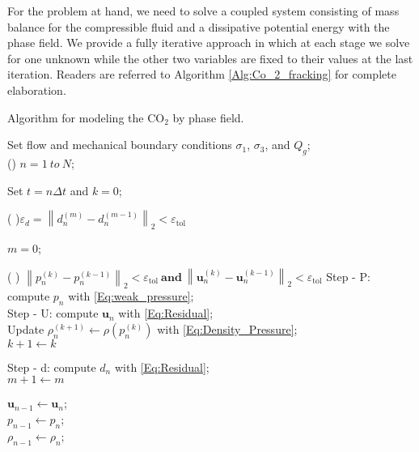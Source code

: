 For the problem at hand, we need to solve a coupled system consisting of mass balance for the compressible fluid and a dissipative potential energy with the phase field. We provide a fully iterative approach in which at each stage we solve for one unknown while the other two variables are fixed to their values at the last iteration. Readers are referred to Algorithm \ref{Alg:Co_2_fracking} for complete elaboration. 

\LinesNumbered
\begin{algorithm}[htbp]
	\caption{Algorithm for modeling the CO$_2$ by phase field.} \label{Alg:Co_2_fracking}
	
	
	Set flow and mechanical boundary conditions $\sigma_1$, $\sigma_3$, and $Q_g$;\\
	
	\For()
	{ {$n= 1 ~ to~ N$};  }{Set  $t=n\Delta t$ and $k=0$; 
		
		{\Repeat( ){$\varepsilon_d=\left\| d_n^{\left( m\right) }-d_{n}^{\left( m-1\right) } \right\|_{2}  <\varepsilon_{\text{tol}}$ }
			{ 
				$m=0$; 
				
				
				
				
				{\Repeat( ){   $\left\| p_n^{\left( k\right) }-p_{n}^{\left( k-1\right) } \right\|_{2}  <\varepsilon_{\text{tol}} ~\textbf{and}~ \left\| \bm{u}_n^{\left( k\right) }-\bm{u}_{n}^{\left( k-1\right) } \right\|_{2}  <\varepsilon_{\text{tol}}$  }
					{
						Step - P: compute $p_n$ with \eqref{Eq:weak_pressure};\\
						Step - U: compute $\bm{u}_{n}$ with \eqref{Eq:Residual};\label{line:compute_u}\\
						
						
						
						Update $ \rho_n^{\left( k+1\right) } \leftarrow \rho(p_n^{\left( k\right) })$ with \eqref{Eq:Density_Pressure};\\
						
						$k+1 \leftarrow k$
					}
				}
				
				
				Step - d: compute $d_n$ with \eqref{Eq:Residual}; \\
				$m+1 \leftarrow m$
			}
		}
		
		$\bm{u}_{n-1} \leftarrow \bm{u}_n$;\\ 
		$p_{n-1} \leftarrow p_n$;\\ 
		$\rho_{n-1} \leftarrow \rho_n$;\\ 
	}
	
\end{algorithm}

